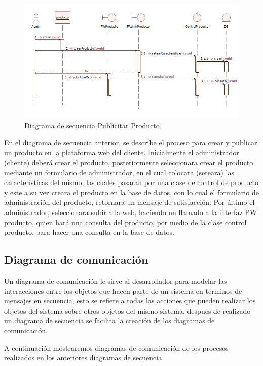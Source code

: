 \newpage
\begin{figure}[th!]
	\centering
	\includegraphics[width=1.0\linewidth]{arquitectura/imagenes/DiagramaDeSecuenciaPP}
	\caption{Diagrama de secuencia Publicitar Producto}
\end{figure}
En el diagrama de secuencia anterior, se describe el proceso para crear y publicar un producto en la plataforma web del cliente. Inicialmente el administrador (cliente) deberá crear el producto, posteriormente seleccionara crear el producto mediante un formulario de administrador, en el cual colocara (seteara) las características del mismo, las cuales pasaran por una clase de control de producto y este a su vez creara el producto en la base de datos, con lo cual el formulario de administración del producto, retornara un mensaje de satisfacción. Por último el administrador, seleccionara subir a la web, haciendo un llamado a la interfaz PW producto, quien hará una consulta del producto, por medio de la clase control producto, para hacer una consulta en la base de datos.

\subsection{Diagrama de comunicación}
Un diagrama de comunicación le sirve al desarrollador para modelar las interacciones entre los objetos que hacen parte de un sistema en términos de mensajes en secuencia, esto se refiere a todas las acciones que pueden realizar los objetos del sistema sobre otros objetos del mismo sistema, después de realizado un diagrama de secuencia se facilita la creación de los diagramas de comunicación.

A continuación mostraremos diagramas de comunicación de los procesos realizados en los anteriores diagramas de secuencia

